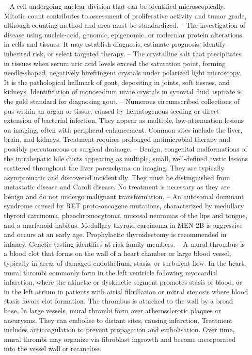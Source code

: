 -- A cell undergoing nuclear division that can be identified microscopically. Mitotic count contributes to assessment of proliferative activity and tumor grade, although counting method and area must be standardized.
-- The investigation of disease using nucleic-acid, genomic, epigenomic, or molecular protein alterations in cells and tissues. It may establish diagnosis, estimate prognosis, identify inherited risk, or select targeted therapy.
-- The crystalline salt that precipitates in tissues when serum uric acid levels exceed the saturation point, forming needle-shaped, negatively birefringent crystals under polarized light microscopy. It is the pathological hallmark of gout, depositing in joints, soft tissues, and kidneys. Identification of monosodium urate crystals in synovial fluid aspirate is the gold standard for diagnosing gout.
-- Numerous circumscribed collections of pus within an organ or tissue, caused by hematogenous seeding or direct extension of bacterial infection. They appear as multiple, low-attenuation lesions on imaging, often with peripheral enhancement. Common sites include the liver, brain, and kidneys. Treatment requires prolonged antimicrobial therapy and possibly percutaneous or surgical drainage.
-- Benign, congenital malformations of the intrahepatic bile ducts appearing as multiple, small, well-defined cystic lesions scattered throughout the liver parenchyma on imaging. They are typically asymptomatic and discovered incidentally. They must be distinguished from metastatic disease and Caroli disease. No treatment is necessary as they are benign and do not undergo malignant transformation.
-- An autosomal dominant syndrome caused by RET proto-oncogene mutations, characterized by medullary thyroid carcinoma, pheochromocytoma, mucosal neuromas of the lips and tongue, and a marfanoid habitus. Medullary thyroid carcinoma in MEN 2B is aggressive and occurs at an early age. Prophylactic thyroidectomy is recommended in infancy. Genetic testing identifies at-risk family members.
-- A mural thrombus is a blood clot that forms on the wall of a heart chamber or large blood vessel, typically in areas of damaged endothelium, stasis, or turbulent flow. In the heart, mural thrombi commonly form in the left ventricle following myocardial infarction, where the akinetic or dyskinetic segment promotes stasis of blood, or in the left atrium in patients with atrial fibrillation or mitral stenosis where blood stasis favors clot formation. The thrombus is attached to the wall by a broad base. In large vessels, mural thrombi form over atherosclerotic plaques or aneurysms. They can embolise to distant sites, causing infarction. Treatment includes anticoagulation to prevent propagation and embolisation. Over time, mural thrombi may organize via fibroblast ingrowth and become incorporated into the vessel wall or recanalise.
